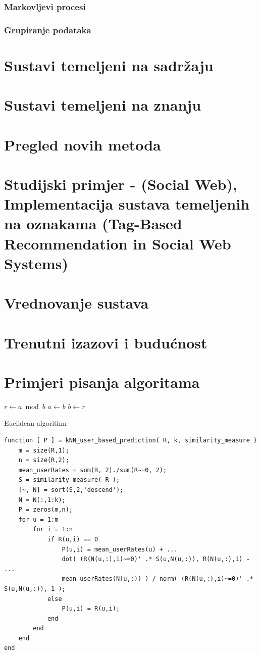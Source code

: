 \documentclass[a4paper,oneside,12pt]{memoir} %
\begin{document}
\subsection{Markovljevi procesi}
%
\subsection{Grupiranje podataka}
%
\chapter{Sustavi temeljeni na sadržaju}	

%
\chapter{Sustavi temeljeni na znanju}	
%
\chapter{Pregled novih metoda}	
%
\chapter{Studijski primjer - (Social Web), Implementacija sustava temeljenih na oznakama (Tag-Based Recommendation in Social Web Systems)}	
%
\chapter{Vrednovanje sustava}	
%
\chapter{Trenutni izazovi i budućnost}	
%
\chapter{Primjeri pisanja algoritama}	
\begin{algorithm}[H]
 {
$r \leftarrow a \bmod b$\;
$a \leftarrow b$\;
$b \leftarrow r$\;
}
\caption{Euclidean algorithm}
\end{algorithm}

\begin{lstlisting}[caption=Test]
function [ P ] = kNN_user_based_prediction( R, k, similarity_measure ) 
    m = size(R,1);
    n = size(R,2);
    mean_userRates = sum(R, 2)./sum(R~=0, 2);
    S = similarity_measure( R );
    [~, N] = sort(S,2,'descend');
    N = N(:,1:k);
    P = zeros(m,n);
    for u = 1:m
        for i = 1:n
            if R(u,i) == 0
                P(u,i) = mean_userRates(u) + ...
                dot( (R(N(u,:),i)~=0)' .* S(u,N(u,:)), R(N(u,:),i) - ...
                mean_userRates(N(u,:)) ) / norm( (R(N(u,:),i)~=0)' .* S(u,N(u,:)), 1 );
            else
                P(u,i) = R(u,i);
            end
        end
    end
end
\end{lstlisting}
\end{document}
